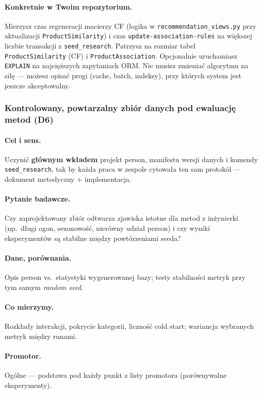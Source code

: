 \documentclass[a4paper,11pt]{article}
\newcommand{\code}[1]{\texttt{\small #1}}
\begin{document}
\paragraph{Konkretnie w Twoim repozytorium.}
Mierzysz czas regeneracji macierzy CF (logika w \code{recommendation\_views.py} przy aktualizacji \code{ProductSimilarity}) i czas \code{update-association-rules} na większej liczbie transakcji z \texttt{seed\_research}. Patrzysz na rozmiar tabel \code{ProductSimilarity} (CF) i \code{ProductAssociation}. Opcjonalnie uruchamiasz \texttt{EXPLAIN} na najcięższych zapytaniach ORM. Nie musisz zmieniać algorytmu na siłę --- możesz opisać progi (cache, batch, indeksy), przy których system jest jeszcze akceptowalny.

\subsubsection{Kontrolowany, powtarzalny zbiór danych pod ewaluację metod (\textbf{D6})}

\paragraph{Cel i sens.}
Uczynić \textbf{głównym wkładem} projekt person, manifestu wersji danych i komendy \texttt{seed\_research}, tak by każda praca w zespole cytowała ten sam protokół --- dokument metodyczny + implementacja.

\paragraph{Pytanie badawcze.}
Czy zaprojektowany zbiór odtwarza zjawiska istotne dla metod z inżynierki (np.\ długi ogon, sezonowość, nierówny udział person) i czy wyniki eksperymentów są stabilne między powtórzeniami seeda?

\paragraph{Dane, porównania.}
Opis person vs.\ statystyki wygenerowanej bazy; testy stabilności metryk przy tym samym \emph{random seed}.

\paragraph{Co mierzymy.}
Rozkłady interakcji, pokrycie kategorii, liczność cold start; wariancja wybranych metryk między runami.

\paragraph{Promotor.}
Ogólne --- podstawa pod każdy punkt z listy promotora (porównywalne eksperymenty).
\end{document}

